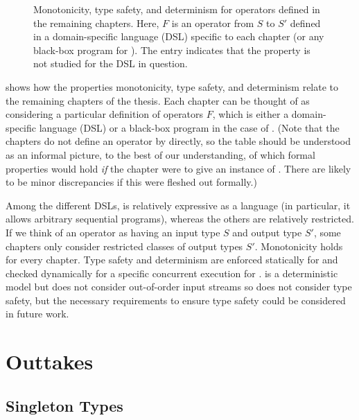 \begin{figure}[t]
\caption[Monotonicity, type safety, and determinism for the remaining chapters.]{Monotonicity, type safety, and determinism for operators defined in the remaining chapters. Here, $F$ is an operator from $S$ to $S'$ defined in a domain-specific language (DSL) specific to each chapter (or any black-box program for ). The entry \NA{} indicates that the property is not studied for the DSL in question.}
\label{fig:operator-properties-chapter-table}
\end{figure}

 shows how the properties monotonicity, type safety, and determinism relate to the remaining chapters of the thesis.
Each chapter can be thought of as considering a particular definition of operators $F$, which is either a domain-specific language (DSL) or a black-box program in the case of .
(Note that the chapters do not define an operator by  directly, so the table should be understood as an informal picture, to the best of our understanding, of which formal properties would hold \emph{if} the chapter were to give an instance of . There are likely to be minor discrepancies if this were fleshed out formally.)

Among the different DSLs,  is relatively expressive as a language (in particular, it allows arbitrary sequential programs), whereas the others are relatively restricted.
If we think of an operator as having an input type $S$ and output type $S'$,
some chapters only consider restricted classes of output types $S'$.
Monotonicity holds for every chapter.
Type safety and determinism are enforced statically for  and checked dynamically for a specific concurrent execution for .
 is a deterministic model but does not consider out-of-order input streams so does not consider type safety, but the necessary
requirements to ensure type safety could be considered in future work.

\section{Outtakes}

\subsection{Singleton Types}
\label{sec:types-discussion}


